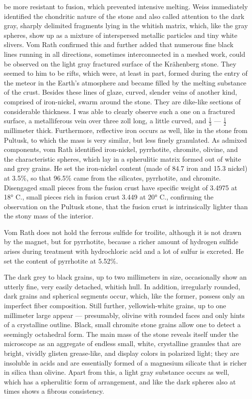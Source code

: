 \documentclass[a4paper, 12pt, oneside]{article}
\begin{document}
be more resistant to fusion, which prevented intensive melting. Weiss immediately identified the chondritic nature of the stone and also called attention to the dark gray, sharply delimited fragments lying in the whitish matrix, which, like the gray spheres, show up as a mixture of interspersed metallic particles and tiny white slivers. Vom Rath confirmed this and further added that numerous fine black lines running in all directions, sometimes interconnected in a meshed work, could be observed on the light gray fractured surface of the Krähenberg stone. They seemed to him to be rifts, which were, at least in part, formed during the entry of the meteor in the Earth's atmosphere and became filled by the melting substance of the crust. Besides these lines of glaze, curved, slender veins of another kind, comprised of iron-nickel, swarm around the stone. They are dike-like sections of considerable thickness. I was able to clearly observe such a one on a fractured surface, a metalliferous vein over three zoll long, a little curved, and $\frac{1}{3}$ --- $\frac{1}{2}$ millimeter thick. Furthermore, reflective iron occurs as well, like in the stone from Pultusk, to which the mass is very similar, but less finely granulated. As admixed components, vom Rath identified iron-nickel, pyrrhotite, chromite, olivine, and the characteristic spheres, which lay in a spherulitic matrix formed out of white and grey grains. He set the iron-nickel content (made of 84.7 iron and 15.3 nickel) at 3.5\%, so that 96.5\% came from the silicates, pyrrhotite, and chromite. Disengaged small pieces from the fusion crust have specific weight of 3.4975 at 18° C., small pieces rich in fusion crust 3.449 at 20° C., confirming the observation on the Pultusk stone, that the fusion crust is intrinsically lighter than the stony mass of the interior.

Vom Rath does not hold the ferrous sulfide for troilite, although it is not drawn by the magnet, but for pyrrhotite, because a richer amount of hydrogen sulfide arises during treatment with hydrochloric acid and a lot of sulfur is excreted. He set the content of pyrrhotite at 5.52\%.

The dark grey to black grains, up to two millimeters in size, occasionally show an utterly fine, very easily detached, whitish hull. In addition, irregularly rounded, dark grains and spherical segments occur, which, like the former, possess only an imperfect fiber composition. Still further, yellowish-white grains, up to one millimeter large appear --- presumably, olivine with rounded faces and only hints of a crystalline outline. Black, small chromite stone grains allow one to detect a seemingly octahedral form. The main mass of the stone reveals itself under the microscope as an aggregate of endless small, white, crystalline granules that are bright, vividly glisten grease-like, and display colors in polarized light; they are insoluble in acids and are essentially formed of a magnesium silicate that is richer in silica than olivine. Apart from this, a light gray substance occurs as well, which has a spherulitic form of arrangement, and like the dark spheres also at times shows a fibrous consistency.
\end{document}
